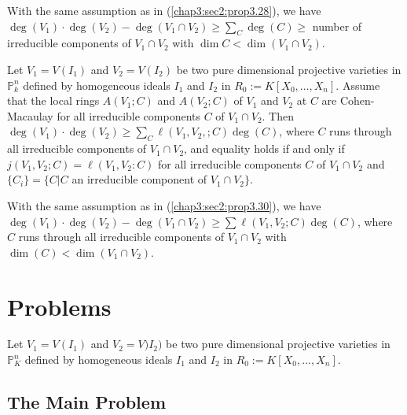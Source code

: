 \setcounter{corollary}{28}
\begin{corollary}\label{chap3:sec2:coro3.29}
  With the same assumption as in (\ref{chap3:sec2:prop3.28}), we
  have  $\deg(V_1) \cdot 
  \deg (V_2)-\deg (V_1 \cap V_2) \geq \sum \limits_C \deg (C) \geq $
  number of irreducible components of  $ V_1 \cap V_2 $
  with  $ \dim C < \dim (V_1 \cap V_2 )$. 
\end{corollary}

\setcounter{proposition}{29}
\begin{proposition}\label{chap3:sec2:prop3.30}
  Let $V_1= V(I_1) $ and  $ V_2 = V(I_2) $ 
    be two pure dimensional projective varieties in  $\mathbb{P}_k^n$
  defined by homogeneous ideals  $ I_1$  and $
  I_2$ in  $ R_0:= K[X_0,\ldots,X_n]$.  Assume that
    the local rings  $ A(V_1;C)$ and  $A(V_2;C)$ 
    of  $V_1$  and  $V_2$  at  $C$ are
    Cohen-Macaulay for all irreducible components  $C$ of $
  V_1 \cap V_2$. Then  $ \deg (V_1 )\cdot \deg (V_2) \geq
  \sum\limits _C \ell (V_1, V_2,;C) \deg (C)$, where 
  $C$ runs through all irreducible components of  $ V_1 \cap
  V_2$,  and equality holds if and only if  $j(V_1,V_2; C)=
  \ell (V_1, V_2: C)$  for all irreducible components  $C$
  of  $V_1 \cap V_2$ and  $\{ C_i\}=
  \{C|C$  an irreducible component of $V_1 \cap V_2\}$. 
\end{proposition}

\setcounter{corollary}{30}
\begin{corollary}\label{chap3:sec2:coro3.31}
  With the same assumption as in (\ref{chap3:sec2:prop3.30}),  we have  
  $\deg (V_1) \cdot \deg (V_2)-\deg (V_1 \cap V_2 ) \geq \sum \ell
  (V_1,V_2; C) \deg (C)$,  
  where $C$  runs through all irreducible components of $V_1 \cap V_2$
  with $\dim (C) < \dim (V_1 \cap V_2)$. 
\end{corollary}

\section{Problems}\label{chap3:sec3}

Let $V_1 =V(I_1) $ and $V_2=V)I_2)$ be two pure dimensional
projective\break 
varieties in $\mathbb{P}_K^n$ defined by homogeneous ideals $I_1$ and
$ I_2$ in \break $R_0:= K[X_0, \ldots, X_n]$. 

\setcounter{subsection}{31}
\subsection{The Main Problem}\label{chap3:sec3:subsec3.32}

